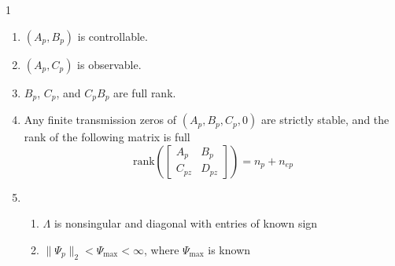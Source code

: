 \documentclass[journal]{IEEEtran}
\theoremstyle{innercustomthm}
\newenvironment{ass-dan}[1]
{\renewcommand\theinnercustomthm{#1}\innercustomthm\normalfont}
{\endinnercustomthm}
\begin{document}
  \begin{ass-dan}{1} $\;$\label{ass.plant}
    \begin{enumerate}[\Alph{enumi}), ref=\Alph{enumi}] %
      \item{$(A_{p},B_{p})$ is controllable.\label{ass.p.cont}}
      \item{$(A_{p},C_{p})$ is observable.\label{ass.p.obsv}}
      \item{$B_{p}$, $C_{p}$, and $C_{p}B_{p}$ are full rank.\label{ass.p.rank}}
      \item{Any finite transmission zeros of $(A_{p},B_{p},C_{p},0)$ are strictly stable, and the rank of the following matrix is full\label{ass.p.tzero}}
      \begin{equation*}
        \text{rank}\left(
        \begin{bmatrix}
          A_{p} & B_{p} \\
          C_{pz} & D_{pz}
        \end{bmatrix}\right)
        =n_{p}+n_{ep}
      \end{equation*}
      \item{%
        \begin{enumerate}[(\alph{enumii}), ref=\alph{enumii}] %
          \item{$\Lambda$ is nonsingular and diagonal with entries of known sign\label{ass.p.unc.lambda}}
          \item{$\|\Psi_{p}\|_{2}<\Psi_{\text{max}}<\infty$, where $\Psi_{\text{max}}$ is known\label{ass.p.unc.wp}}
        \end{enumerate}\label{ass.p.unc}
      }
    \end{enumerate}
  \end{ass-dan}
\end{document}
